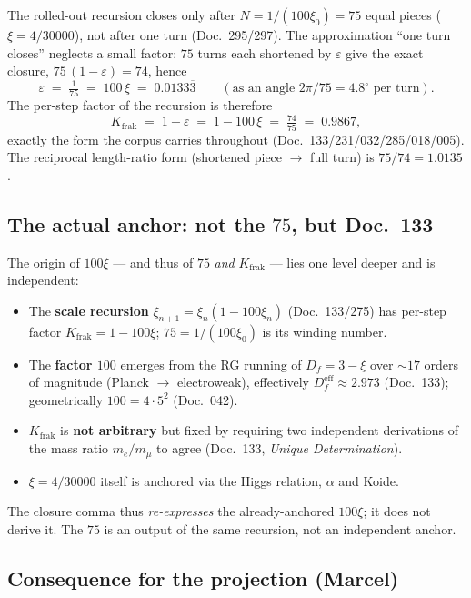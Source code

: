 The rolled-out recursion closes only after $N=1/(100\xi_0)=75$ equal pieces
($\xi=4/30000$), not after one turn (Doc.~295/297). The approximation
\enquote{one turn closes} neglects a small factor: $75$ turns each shortened by
$\varepsilon$ give the exact closure, $75\,(1-\varepsilon)=74$, hence
\begin{equation}
  \varepsilon \;=\; \tfrac{1}{75} \;=\; 100\,\xi \;=\; 0{.}0133\overline{3}
  \qquad(\text{as an angle } 2\pi/75 = 4{.}8^\circ \text{ per turn}).
\end{equation}
The per-step factor of the recursion is therefore
\begin{equation}
  K_{\text{frak}} \;=\; 1 - \varepsilon \;=\; 1 - 100\,\xi \;=\; \tfrac{74}{75}
  \;=\; 0{.}9867,
\end{equation}
exactly the form the corpus carries throughout (Doc.~133/231/032/285/018/005).
The reciprocal length-ratio form (shortened piece $\to$ full turn) is
$75/74 = 1{.}0135$.


\subsection*{The actual anchor: not the $75$, but Doc.~133}

The origin of $100\xi$ --- and thus of $75$ \emph{and} $K_{\text{frak}}$ ---
lies one level deeper and is independent:
\begin{itemize}
  \item The \textbf{scale recursion} $\xi_{n+1}=\xi_n(1-100\xi_n)$
    (Doc.~133/275) has per-step factor $K_{\text{frak}}=1-100\xi$;
    $75=1/(100\xi_0)$ is its winding number.
  \item The \textbf{factor $100$} emerges from the RG running of $D_f=3-\xi$
    over $\sim 17$ orders of magnitude (Planck $\to$ electroweak), effectively
    $D_f^{\text{eff}}\approx 2{.}973$ (Doc.~133); geometrically $100=4\cdot 5^2$
    (Doc.~042).
  \item $K_{\text{frak}}$ is \textbf{not arbitrary} but fixed by requiring two
    independent derivations of the mass ratio $m_e/m_\mu$ to agree (Doc.~133,
    \emph{Unique Determination}).
  \item $\xi=4/30000$ itself is anchored via the Higgs relation, $\alpha$ and
    Koide.
\end{itemize}
The closure comma thus \emph{re-expresses} the already-anchored $100\xi$; it
does not derive it. The $75$ is an output of the same recursion, not an
independent anchor.

\subsection*{Consequence for the projection (Marcel)}


